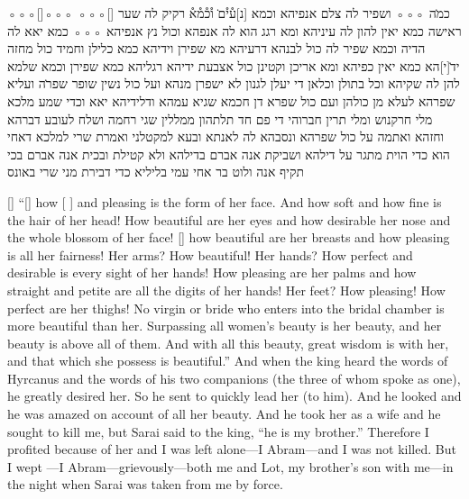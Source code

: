 \begin{aramaictext}
    ◦◦◦[\hspace{3em}]◦◦◦
    ◦◦◦[\hspace{9em}] כמ̇ה ◦◦◦ ושפיר לה צלם אנפיהא וכמא
    [נ]ע֯י֯ם̇ ו֯כ֯מ֯א֯ רקיק לה שער ראישה כמא יאין להון לה עיניהא ומא רגג הוא
    לה אנפהא וכול נץ
    אנפיהא ◦◦◦ כמא יאא לה הדיה וכמא שפיר לה כול לבנהא דרעיהא מא
    שפירן וידיהא כמא
    כלילן וחמיד כול מחזה יד̇[י]הא כמא יאין כפיהא ומא אריכן וקטינן כול
    אצבעת ידיהא רגליהא
    כמא שפירן וכמא שלמא להן לה שקיהא וכל בתולן וכלאן די יעלן לגנון
    לא ישפרן מנהא ועל כול
    נשין שופר שפר̇ה ועליא שפרהא לעלא מן כולהן ועם כול שפרא דן חכמא
    שגיא עמהא ודלידיהא
    יאא וכדי שמע מלכא מלי חרקנוש ומלי תרין חברוהי די פם חד תלתהון
    ממללין שגי רחמה ושלח
    לעובע דברהא וחזהא ואתמה על כול שפרהא ונסבהא לה לאנתא ובעא
    למקטלני ואמרת שרי
    למלכא דאחי הוא כדי הוית מתגר על דילהא ושביקת אנה אברם בדילהא
    ולא קטילת ובכית אנה
    אברם בכי תקיף אנה ולוט בר אחי עמי בליליא כדי דבירת מני שרי באונס
    \vacat
\end{aramaictext}

\begin{translation}
    [\hspace{1em}]
    ``[\hspace{1em}] how [ ] and pleasing is the form of her face. And how
    soft and how fine is the hair of her head!
    How beautiful are her eyes and how desirable her nose and the whole blossom 
    of her face! [\hspace{1em}] how beautiful are her breasts and how pleasing is all her fairness! Her arms? How beautiful! Her hands? How 
    perfect and desirable is every sight of her hands! How pleasing  are her palms and how straight and petite are all the digits of her hands! Her feet?
    How pleasing! How perfect are her thighs! No virgin or bride who enters into the bridal chamber is more beautiful than her. Surpassing all
    women's beauty is her beauty, and her beauty is above all of them. And with all this beauty, great wisdom is with her, and that which she possess is 
    beautiful.'' And when the king heard the words of Hyrcanus and the words of his two companions (the three of whom spoke as one), he greatly desired her. So he sent
    to quickly lead her (to him). And he looked and he was amazed on account of all her beauty. And he took her as a wife and he sought to kill me, but Sarai said
    to the king, ``he is my brother.'' Therefore I profited because of her and I was left alone---I Abram---and I was not killed. But I wept
    ---I Abram---grievously---both me and Lot, my brother's son with me---in the night when Sarai was taken from me by force.
\end{translation}

